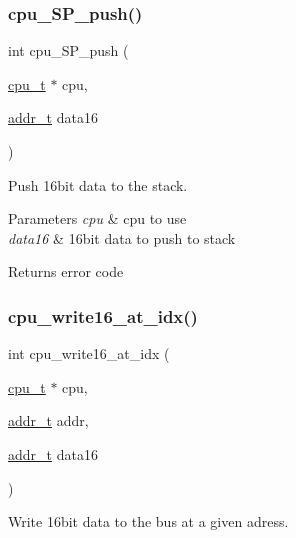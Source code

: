 \subsubsection{\texorpdfstring{cpu\+\_\+\+S\+P\+\_\+push()}{cpu\_SP\_push()}}
{\footnotesize\ttfamily int cpu\+\_\+\+S\+P\+\_\+push (\begin{DoxyParamCaption}\item[{\hyperlink{structcpu__t}{cpu\+\_\+t} $\ast$}]{cpu,  }\item[{\hyperlink{memory_8h_a8a6444037e4d5cc2bf8ba22a9d9e33ca}{addr\+\_\+t}}]{data16 }\end{DoxyParamCaption})}



Push 16bit data to the stack. 


\begin{DoxyParams}{Parameters}
{\em cpu} & cpu to use \\
\hline
{\em data16} & 16bit data to push to stack\\
\hline
\end{DoxyParams}
\begin{DoxyReturn}{Returns}
error code 
\end{DoxyReturn}
\mbox{\label{cpu-storage_8h_a0028e52dcb528bbee5ab3945357f2729}} 
\subsubsection{\texorpdfstring{cpu\+\_\+write16\+\_\+at\+\_\+idx()}{cpu\_write16\_at\_idx()}}
{\footnotesize\ttfamily int cpu\+\_\+write16\+\_\+at\+\_\+idx (\begin{DoxyParamCaption}\item[{\hyperlink{structcpu__t}{cpu\+\_\+t} $\ast$}]{cpu,  }\item[{\hyperlink{memory_8h_a8a6444037e4d5cc2bf8ba22a9d9e33ca}{addr\+\_\+t}}]{addr,  }\item[{\hyperlink{memory_8h_a8a6444037e4d5cc2bf8ba22a9d9e33ca}{addr\+\_\+t}}]{data16 }\end{DoxyParamCaption})}



Write 16bit data to the bus at a given adress. 


